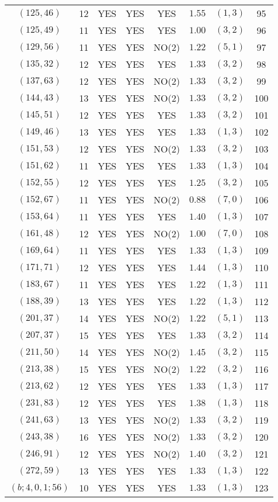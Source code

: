 \begin{longtable}{|c|c|c|c|c|c|c|c|}
$(125,46)$ & 12 & YES & YES & YES & $1.55$ & $(1,3)$ & 95\\
$(125,49)$ & 11 & YES & YES & YES & $1.00$ & $(3,2)$ & 96\\
$(129,56)$ & 11 & YES & YES & NO(2) & $1.22$ & $(5,1)$ & 97\\
$(135,32)$ & 12 & YES & YES & YES & $1.33$ & $(3,2)$ & 98\\
$(137,63)$ & 12 & YES & YES & NO(2) & $1.33$ & $(3,2)$ & 99\\
$(144,43)$ & 13 & YES & YES & NO(2) & $1.33$ & $(3,2)$ & 100\\
$(145,51)$ & 12 & YES & YES & YES & $1.33$ & $(3,2)$ & 101\\
$(149,46)$ & 13 & YES & YES & YES & $1.33$ & $(1,3)$ & 102\\
$(151,53)$ & 12 & YES & YES & NO(2) & $1.33$ & $(3,2)$ & 103\\
$(151,62)$ & 11 & YES & YES & YES & $1.33$ & $(1,3)$ & 104\\
$(152,55)$ & 12 & YES & YES & YES & $1.25$ & $(3,2)$ & 105\\
$(152,67)$ & 11 & YES & YES & NO(2) & $0.88$ & $(7,0)$ & 106\\
$(153,64)$ & 11 & YES & YES & YES & $1.40$ & $(1,3)$ & 107\\
$(161,48)$ & 12 & YES & YES & NO(2) & $1.00$ & $(7,0)$ & 108\\
$(169,64)$ & 11 & YES & YES & YES & $1.33$ & $(1,3)$ & 109\\
$(171,71)$ & 12 & YES & YES & YES & $1.44$ & $(1,3)$ & 110\\
$(183,67)$ & 11 & YES & YES & YES & $1.22$ & $(1,3)$ & 111\\
$(188,39)$ & 13 & YES & YES & YES & $1.22$ & $(1,3)$ & 112\\
$(201,37)$ & 14 & YES & YES & NO(2) & $1.22$ & $(5,1)$ & 113\\
$(207,37)$ & 15 & YES & YES & YES & $1.33$ & $(3,2)$ & 114\\
$(211,50)$ & 14 & YES & YES & NO(2) & $1.45$ & $(3,2)$ & 115\\
$(213,38)$ & 15 & YES & YES & NO(2) & $1.22$ & $(3,2)$ & 116\\
$(213,62)$ & 12 & YES & YES & YES & $1.33$ & $(1,3)$ & 117\\
$(231,83)$ & 12 & YES & YES & YES & $1.38$ & $(1,3)$ & 118\\
$(241,63)$ & 13 & YES & YES & NO(2) & $1.33$ & $(3,2)$ & 119\\
$(243,38)$ & 16 & YES & YES & NO(2) & $1.33$ & $(3,2)$ & 120\\
$(246,91)$ & 12 & YES & YES & NO(2) & $1.40$ & $(3,2)$ & 121\\
$(272,59)$ & 13 & YES & YES & YES & $1.33$ & $(1,3)$ & 122\\
$(b;4,0,1;56)$ & 10 & YES & YES & YES & $1.33$ & $(1,3)$ & 123
\end{longtable}
